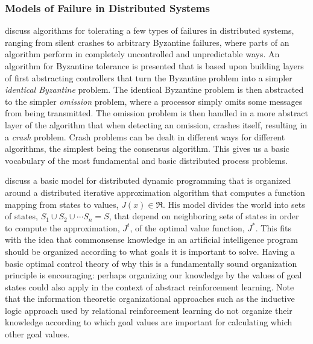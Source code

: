 \subsubsection{Models of Failure in Distributed Systems}

\cite{attiya:2004} discuss algorithms for tolerating a few types of failures in distributed systems, ranging from silent crashes to arbitrary Byzantine failures, where parts of an algorithm perform in completely uncontrolled and unpredictable ways.
An algorithm for Byzantine tolerance is presented that is based upon building layers of first abstracting controllers that turn the Byzantine problem into a simpler \emph{identical Byzantine} problem.
The identical Byzantine problem is then abstracted to the simpler \emph{omission} problem, where a processor simply omits some messages from being transmitted.
The omission problem is then handled in a more abstract layer of the algorithm that when detecting an omission, crashes itself, resulting in a \emph{crash} problem.
Crash problems can be dealt in different ways for different algorithms, the simplest being the consensus algorithm.
This gives us a basic vocabulary of the most fundamental and basic distributed process problems.

\cite{bertsekas:1982} discuss a basic model for distributed dynamic programming that is organized around a distributed iterative approximation algorithm that computes a function mapping from states to values, $J(x){\in}\Re$.
His model divides the world into sets of states, $S_1 \cup S_2 \cup \cdots S_n = S$, that depend on neighboring sets of states in order to compute the approximation, $J^t$, of the optimal value function, $J^*$.
This fits with the idea that commonsense knowledge in an artificial intelligence program should be organized according to what goals it is important to solve.
Having a basic optimal control theory of why this is a fundamentally sound organization principle is encouraging: perhaps organizing our knowledge by the values of goal states could also apply in the context of abstract reinforcement learning.
Note that the information theoretic organizational approaches such as the inductive logic approach used by relational reinforcement learning do not organize their knowledge according to which goal values are important for calculating which other goal values.

